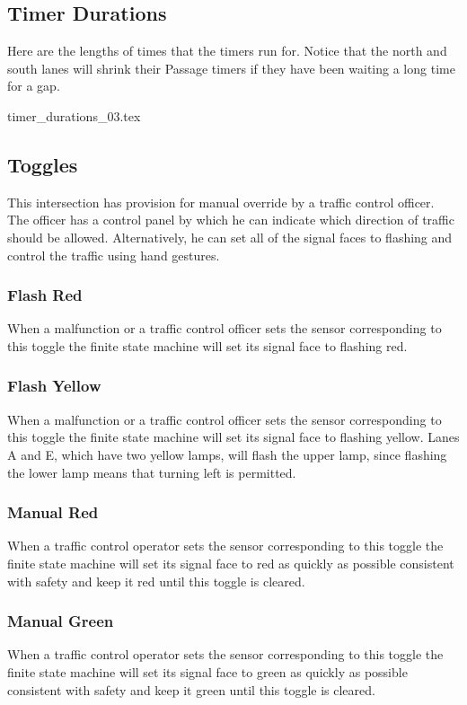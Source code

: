 \documentclass[letterpaper,twoside]{article}
\begin{document}
\subsection{Timer Durations}

Here are the lengths of times that the timers run for.
Notice that the north and south lanes will shrink their Passage timers
if they have been waiting a long time for a gap.

 {timer_durations_03.tex}

\subsection{Toggles}

This intersection has provision for manual override by a traffic control
officer.  The officer has a control panel by which he can indicate which
direction of traffic should be allowed.  Alternatively, he can set all
of the signal faces to flashing and control the traffic using hand gestures.

\subsubsection{Flash Red}
When a malfunction or a traffic control officer sets
the sensor corresponding to this toggle
the finite state machine will set its signal face to flashing red.

\subsubsection{Flash Yellow}
When a malfunction or a traffic control officer sets
the sensor corresponding to this toggle
the finite state machine will set its signal face to flashing yellow.
Lanes A and E, which have two yellow lamps, will flash the upper lamp,
since flashing the lower lamp means that turning left is permitted.

\subsubsection{Manual Red}
When a traffic control operator sets
the sensor corresponding to this toggle the finite state machine
will set its signal face to red as quickly as possible consistent with
safety and keep it red until this toggle is cleared.

\subsubsection{Manual Green}
When a traffic control operator sets
the sensor corresponding to this toggle the finite state machine
will set its signal face to green as quickly as possible consistent with
safety and keep it green until this toggle is cleared.
\end{document}
